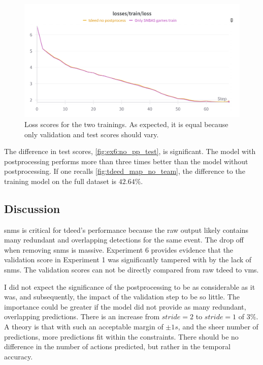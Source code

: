 \begin{figure}
    \centering
    \includegraphics[width=0.75\linewidth]{figures/no_pprocess_loss.png}
    \caption{Loss scores for the two trainings. As expected, it is equal because only validation and test scores should vary.}
    \label{fig:ex6:no_pp_loss}
\end{figure}

The difference in test scores, \cref{fig:ex6:no_pp_test}, is significant. The model with postprocessing performs more than three times better than the model without postprocessing. If one recalls \cref{fig:tdeed_map_no_team}, the difference to the training model on the full dataset is $42.64\%$. 

\subsection{Discussion}
\label{ssec:ex6_discussion}

\acrfull{snms} is critical for \acrshort{tdeed}'s performance because the raw output likely contains many redundant and overlapping detections for the same event. The drop off when removing \acrshort{snms} is massive. Experiment 6 provides evidence that the validation score in Experiment 1 was significantly tampered with by the lack of \acrshort{snms}. The validation scores can not be directly compared from raw \acrshort{tdeed} to \acrshort{vms}. 

I did not expect the significance of the postprocessing to be as considerable as it was, and subsequently, the impact of the validation step to be so little. The importance could be greater if the model did not provide as many redundant, overlapping predictions. There is an increase from $stride=2$ to $stride=1$ of $3\%$. A theory is that with such an acceptable margin of $\pm1s$, and the sheer number of predictions, more predictions fit within the constraints. There should be no difference in the number of actions predicted, but rather in the temporal accuracy. 


